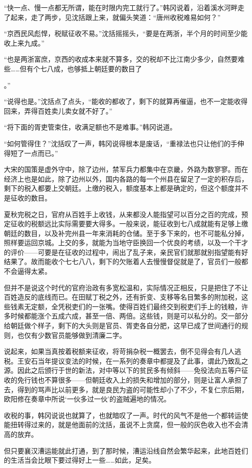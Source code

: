 “快一点、慢一点都无所谓，能在时限内完工就行了。”韩冈说着，沿着溪水河畔走了起来，走了两步，见沈括跟上来，就偏头笑道：“唐州收税难易如何？”

“京西民风彪悍，税赋征收不易。”沈括摇摇头，“要是在两浙，半个月的时间至少能收上来九成。”

“也是两浙富庶，京西的收成本来就不算多，交的税却不比江南少多少，自然要难些……但有个七八成，也够抵上朝廷要的数目了

。”

“说得也是。”沈括点了点头，“能收的都收了，剩下的就算再催逼，也不一定能收得回来，弄得百姓卖儿卖女就不好了。”

“将下面的胥吏管束住，收满足额也不是难事。”韩冈说道。

“如何管得住？”沈括叹了一声，韩冈说得根本是废话，“重禄法也只让他们的手伸得短了一点而已。”

大宋的国策是虚外守中，除了边州，禁军兵力都集中在京畿，外路为数寥寥。而在经济上也是如此，除了边州以外，国内各路的每一个州县在留足了一定的积存后，剩下的税入都要上交朝廷。上缴的税入，额度基本上都是确定的，但这个额度并不是征收的数目。

夏秋完税之日，官府从百姓手上收钱，从来都没人能指望可以百分之百的完成，预定征收的税额远比实际需要要大得多。一般来说，能征收到七八成就能有足够上缴朝廷的数目，以及补完州县一年来消耗的仓储。至于多下来的，也不可能私分掉，照样要运回京城。上交的多，就能为当地守臣换回一个优良的考绩，以及一个干才的评价——可要是在征收的过程中，闹出了乱子来，亲民官们就那就别指望能有好结果了。故而能收个七七八八，剩下的欠账着人去慢慢督促就是了，官员们一般都不会逼得太紧。

但并不是说这个时代的官府治政有多宽松温和，实际情况正相反，只是把住了不让百姓造反的底线而已。在田赋丁税之外，还有折变、支移等名目繁多的附加税，这些钱素无定额，全凭税吏们的一张嘴。使得百姓们最终交到税吏们手上的钱粮，许多时候都能涨个五成六成，甚至一倍、两倍。这些钱，则是可以私分的。交一部分给朝廷做个样子，剩下的大头则是官员、胥吏各自分肥，这早已成了世间通行的规则，也仅有少数官员能够做到清廉二字。

说起来，如果当真按着税额来征收，将苛捐杂税一概罢去，倒不见得会有几人逃税。王安石当年提议变法的时候，在一系列的奏章中都提及了此事，谓此乃致乱之源。因此之后颁行于世的新法，对中等以下的贫民多有倾斜——免役法向五等户征收的免行钱也不算很多——但朝廷收入上的损失和增加的部分，则是让富人承担了去，得到的骂声比以前更多，就是良民为盗的可能性却小了不少，不复仁宗后期，欧阳修在奏章中所说‘一伙多过一伙’的盗贼遍地的情况。

收税的事，韩冈说说也就算了，也就暗叹了一声。时代的风气不是他一个都转运使能扭转得过来的，就是他面前的沈括，虽说不上贪腐，但一般的灰色收入也不会清高的放弃。

但只要襄汉漕运能就此打通，到了那时候，漕运沿线自然会繁华起来，此地百姓们的生活当会比眼下要过得好上一些……如此，足矣。


